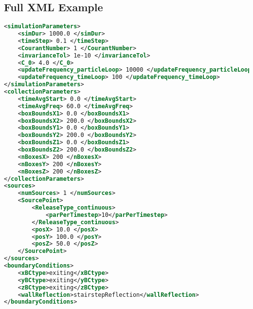\subsection{Full XML Example}
\begin{lstlisting}[language=XML]
<simulationParameters>
    <simDur> 1000.0 </simDur>
    <timeStep> 0.1 </timeStep>
    <CourantNumber> 1 </CourantNumber>
    <invarianceTol> 1e-10 </invarianceTol>
    <C_0> 4.0 </C_0>
    <updateFrequency_particleLoop> 10000 </updateFrequency_particleLoop>
    <updateFrequency_timeLoop> 100 </updateFrequency_timeLoop>
</simulationParameters>
<collectionParameters>
    <timeAvgStart> 0.0 </timeAvgStart>
    <timeAvgFreq> 60.0 </timeAvgFreq>
    <boxBoundsX1> 0.0 </boxBoundsX1>
    <boxBoundsX2> 200.0 </boxBoundsX2>
    <boxBoundsY1> 0.0 </boxBoundsY1>
    <boxBoundsY2> 200.0 </boxBoundsY2>
    <boxBoundsZ1> 0.0 </boxBoundsZ1>
    <boxBoundsZ2> 200.0 </boxBoundsZ2>
    <nBoxesX> 200 </nBoxesX>
    <nBoxesY> 200 </nBoxesY>
    <nBoxesZ> 200 </nBoxesZ>
</collectionParameters>
<sources>
    <numSources> 1 </numSources>
    <SourcePoint>
        <ReleaseType_continuous>
            <parPerTimestep>10</parPerTimestep>
        </ReleaseType_continuous>
        <posX> 10.0 </posX>
        <posY> 100.0 </posY>
        <posZ> 50.0 </posZ>
  	</SourcePoint>
</sources>
<boundaryConditions>
    <xBCtype>exiting</xBCtype>
    <yBCtype>exiting</yBCtype>
    <zBCtype>exiting</zBCtype>
    <wallReflection>stairstepReflection</wallReflection>
</boundaryConditions>
\end{lstlisting}

